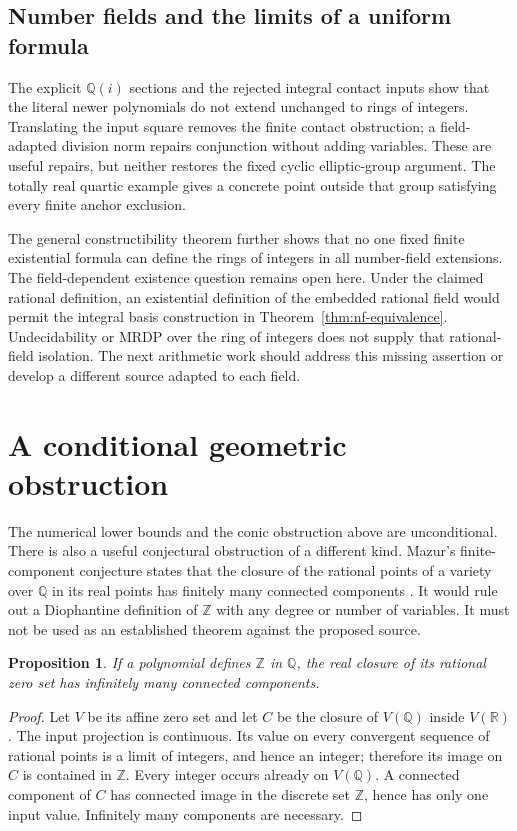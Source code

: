 \documentclass[11pt]{article}
\newtheorem{proposition}[theorem]{Proposition}
\theoremstyle{definition}
\newcommand{\Q}{\mathbb Q}
\newcommand{\Z}{\mathbb Z}
\begin{document}
\subsection{Number fields and the limits of a uniform formula}

The explicit $\mathbb Q(i)$ sections and the rejected integral contact
inputs show that the literal newer polynomials do not extend unchanged
to rings of integers. Translating the input square removes the finite
contact obstruction; a field-adapted division norm repairs conjunction
without adding variables. These are useful repairs, but neither restores
the fixed cyclic elliptic-group argument. The totally real quartic
example gives a concrete point outside that group satisfying every
finite anchor exclusion.

The general constructibility theorem further shows that no one fixed
finite existential formula can define the rings of integers in all
number-field extensions. The field-dependent existence question remains
open here. Under the claimed rational definition, an existential
definition of the embedded rational field would permit the integral
basis construction in Theorem~\ref{thm:nf-equivalence}. Undecidability
or MRDP over the ring of integers does not supply that rational-field
isolation. The next arithmetic work should address this missing
assertion or develop a different source adapted to each field.


\section{A conditional geometric obstruction}
\label{sec:mazur}

The numerical lower bounds and the conic obstruction above are
unconditional. There is also a useful
conjectural obstruction of a different kind. Mazur's finite-component
conjecture states that the closure of the rational points of a variety
over $\Q$ in its real points has finitely many connected components
\cite[Conjecture 3]{Mazur1995}. It would rule out a Diophantine
definition of $\Z$ with any degree or number of variables. It must
not be used as an established theorem against the proposed source.

\begin{proposition}
If a polynomial defines $\Z$ in $\Q$, the real closure of its rational
zero set has infinitely many connected components.
\end{proposition}
\begin{proof}
Let $V$ be its affine zero set and let $C$ be the closure of $V(\Q)$
inside $V(\mathbb R)$. The input projection is continuous. Its value
on every convergent sequence of rational points is a limit of integers,
and hence an integer; therefore its image on $C$ is contained in $\Z$.
Every integer occurs already on $V(\Q)$. A connected component of
$C$ has connected image in the discrete set $\Z$, hence has only one
input value. Infinitely many components are necessary.
\end{proof}
\end{document}

